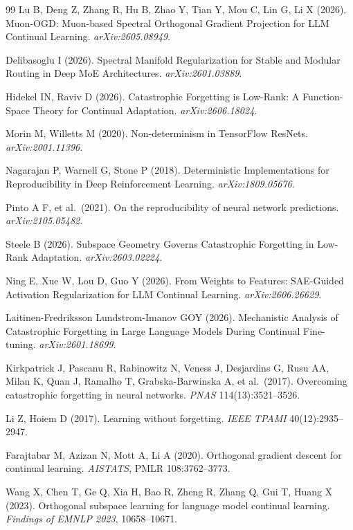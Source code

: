 \documentclass[11pt,a4paper]{article}
\begin{document}
\begin{thebibliography}{99}
Lu B, Deng Z, Zhang R, Hu B, Zhao Y, Tian Y, Mou C, Lin G, Li X (2026).
Muon-OGD: Muon-based Spectral Orthogonal Gradient Projection for LLM
Continual Learning.
\emph{arXiv:2605.08949}.

Delibasoglu I (2026).
Spectral Manifold Regularization for Stable and Modular Routing in Deep
MoE Architectures.
\emph{arXiv:2601.03889}.

Hidekel IN, Raviv D (2026).
Catastrophic Forgetting is Low-Rank: A Function-Space Theory for Continual
Adaptation.
\emph{arXiv:2606.18024}.

Morin M, Willetts M (2020).
Non-determinism in TensorFlow ResNets.
\emph{arXiv:2001.11396}.

Nagarajan P, Warnell G, Stone P (2018).
Deterministic Implementations for Reproducibility in Deep Reinforcement
Learning.
\emph{arXiv:1809.05676}.

Pinto A F, et al.\ (2021).
On the reproducibility of neural network predictions.
\emph{arXiv:2105.05482}.

Steele B (2026).
Subspace Geometry Governs Catastrophic Forgetting in Low-Rank Adaptation.
\emph{arXiv:2603.02224}.

Ning E, Xue W, Lou D, Guo Y (2026).
From Weights to Features: SAE-Guided Activation Regularization for LLM
Continual Learning.
\emph{arXiv:2606.26629}.

Laitinen-Fredriksson Lundstrom-Imanov GOY (2026).
Mechanistic Analysis of Catastrophic Forgetting in Large Language Models
During Continual Fine-tuning.
\emph{arXiv:2601.18699}.

Kirkpatrick J, Pascanu R, Rabinowitz N, Veness J, Desjardins G, Rusu AA,
Milan K, Quan J, Ramalho T, Grabska-Barwinska A, et al.\ (2017).
Overcoming catastrophic forgetting in neural networks.
\emph{PNAS} 114(13):3521--3526.

Li Z, Hoiem D (2017).
Learning without forgetting.
\emph{IEEE TPAMI} 40(12):2935--2947.

Farajtabar M, Azizan N, Mott A, Li A (2020).
Orthogonal gradient descent for continual learning.
\emph{AISTATS}, PMLR 108:3762--3773.

Wang X, Chen T, Ge Q, Xia H, Bao R, Zheng R, Zhang Q, Gui T, Huang X (2023).
Orthogonal subspace learning for language model continual learning.
\emph{Findings of EMNLP 2023}, 10658--10671.


\end{thebibliography}
\end{document}
